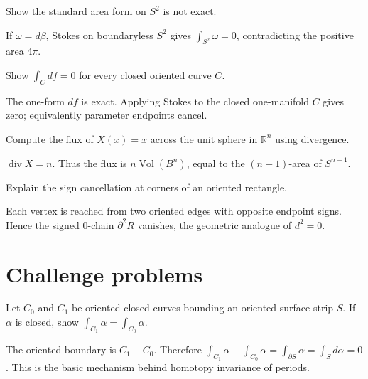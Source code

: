 \begin{problem}\label{prob:vii11-09}
Show the standard area form on $S^2$ is not exact.
\end{problem}
\begin{solution}
If $\omega=d\beta$, Stokes on boundaryless $S^2$ gives $\int_{S^2}\omega=0$, contradicting the positive area $4\pi$.
\end{solution}

\begin{problem}\label{prob:vii11-10}
Show $\int_Cdf=0$ for every closed oriented curve $C$.
\end{problem}
\begin{solution}
The one-form $df$ is exact. Applying Stokes to the closed one-manifold $C$ gives zero; equivalently parameter endpoints cancel.
\end{solution}

\begin{problem}\label{prob:vii11-11}
Compute the flux of $X(x)=x$ across the unit sphere in $\mathbb R^n$ using divergence.
\end{problem}
\begin{solution}
$\operatorname{div}X=n$. Thus the flux is $n\operatorname{Vol}(B^n)$, equal to the $(n-1)$-area of $S^{n-1}$.
\end{solution}

\begin{problem}\label{prob:vii11-12}
Explain the sign cancellation at corners of an oriented rectangle.
\end{problem}
\begin{solution}
Each vertex is reached from two oriented edges with opposite endpoint signs. Hence the signed $0$-chain $\partial^2R$ vanishes, the geometric analogue of $d^2=0$.
\end{solution}


\section{Challenge problems}

\begin{problem}\label{prob:vii11-ch01}
Let $C_0$ and $C_1$ be oriented closed curves bounding an oriented surface strip $S$. If $\alpha$ is closed, show $\int_{C_1}\alpha=\int_{C_0}\alpha$.
\end{problem}
\begin{solution}
The oriented boundary is $C_1-C_0$. Therefore $\int_{C_1}\alpha-\int_{C_0}\alpha=\int_{\partial S}\alpha=\int_Sd\alpha=0$. This is the basic mechanism behind homotopy invariance of periods.
\end{solution}

